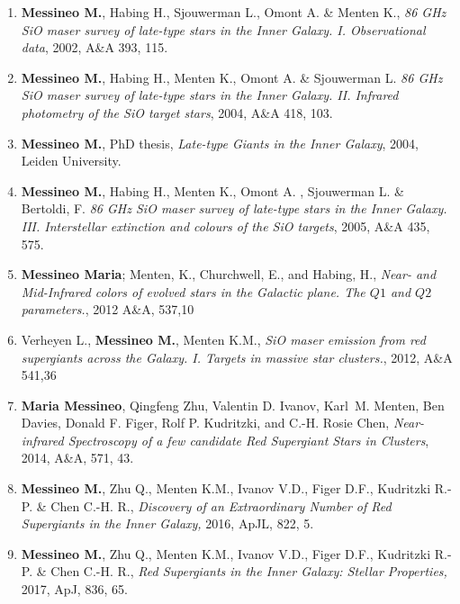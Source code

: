 \documentclass[final,11pt,onecolumn,a4paper,twoside]{scrbook_gj}
\begin{document}
\begin{enumerate}
\item    {\bf Messineo M.}, Habing H., Sjouwerman L., Omont A. \&
    Menten K., {\it 86 GHz SiO maser survey of late-type stars in the Inner Galaxy. I.
    Observational data}, 2002, A\&A 393, 115.
    
\item    {\bf Messineo M.}, Habing H.,   Menten K., Omont A. \& Sjouwerman L. {\it
    86 GHz SiO maser survey of late-type stars in the Inner Galaxy. II.
    Infrared photometry of the SiO target stars}, 2004, A\&A 418, 103.
    
\item    {\bf Messineo M.}, PhD thesis, {\it Late-type Giants in the Inner Galaxy}, 
2004, Leiden University.


\item    {\bf Messineo M.}, Habing H.,   Menten K., Omont A. , Sjouwerman L. \& Bertoldi, F.{\it
    86 GHz SiO maser survey of late-type stars in the Inner Galaxy. III.
    Interstellar extinction and colours of the SiO targets}, 2005, A\&A 435, 575.



\item {\bf Messineo Maria}; Menten, K.,  Churchwell, E., and  Habing, H.,
{\it  Near- and Mid-Infrared colors of  evolved stars in the Galactic plane.
The $Q1$ and $Q2$ parameters.}, 2012 A\&A, 537,10

\item Verheyen L., {\bf Messineo M.}, Menten K.M.,
{\it SiO maser emission from red supergiants across the Galaxy. I. Targets in massive
star clusters.}, 2012, A\&A 541,36


		
\item {\bf Maria Messineo}, Qingfeng Zhu, Valentin D. Ivanov, Karl~M. Menten, Ben Davies, 
Donald F.  Figer, Rolf P. Kudritzki, and  C.-H. Rosie Chen,
{\it Near-infrared Spectroscopy of a few candidate Red Supergiant Stars in  Clusters}, 2014, A\&A, 571, 43.


\item
{\bf Messineo M.}, Zhu Q., Menten K.M., Ivanov V.D., Figer D.F., Kudritzki R.-P. \& Chen C.-H. R.,
{\it Discovery of an Extraordinary Number of Red Supergiants in the Inner Galaxy,} 2016, ApJL, 822, 5.

\item
{\bf Messineo M.}, Zhu Q., Menten K.M., Ivanov V.D., Figer D.F., Kudritzki R.-P. \& Chen C.-H. R.,
{\it Red Supergiants in the Inner Galaxy: Stellar Properties,} 2017,  ApJ, 836, 65.


\end{enumerate}
\end{document}
